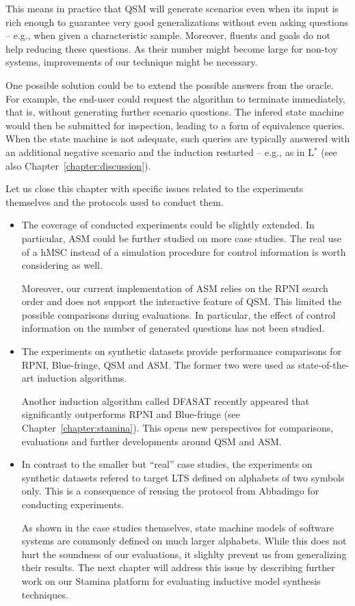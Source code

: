 \begin{itemize}
This means in practice that QSM will generate scenarios even when its input is rich enough to guarantee very good generalizations without even asking questions -- e.g., when given a characteristic sample. Moreover, fluents and goals do not help reducing these questions. As their number might become large for non-toy systems, improvements of our technique might be necessary.

One possible solution could be to extend the possible answers from the oracle. For example, the end-user could request  the algorithm to terminate immediately, that is, without generating further scenario questions. The infered state machine would then be submitted for inspection, leading to a form of equivalence queries. When the state machine is not adequate, such queries are typically answered with an additional negative scenario and the induction restarted -- e.g., as in L$^*$ \cite{Angluin:1987} (see also Chapter~\ref{chapter:discussion}).

\end{itemize}

Let us close this chapter with specific issues related to the experiments themselves and the protocols used to conduct them. 
\begin{itemize}

\item The coverage of conducted experiments could be slightly extended. In particular, ASM could be further studied on more case studies. The real use of a hMSC instead of a simulation procedure for control information is worth considering as well.

Moreover, our current implementation of ASM relies on the RPNI search order and does not support the interactive feature of QSM. This limited the possible comparisons during evaluations. In particular, the effect of control information on the number of generated questions has not been studied.

\item The experiments on synthetic datasets provide performance comparisons for RPNI, Blue-fringe, QSM and ASM. The former two were used as state-of-the-art induction algorithms. 

Another induction algorithm called DFASAT recently appeared that significantly outperforms RPNI and Blue-fringe \cite{Heule:2010} (see Chapter~\ref{chapter:stamina}). This opens new perspectives for comparisons, evaluations and further developments around QSM and ASM. 

\item In contrast to the smaller but ``real'' case studies, the experiments on synthetic datasets refered to target LTS defined on alphabets of two symbols only. This is a consequence of reusing the protocol from Abbadingo for conducting experiments. 

As shown in the case studies themselves, state machine models of software systems are commonly defined on much larger alphabets. While this does not hurt the soundness of our evaluations, it slighlty prevent us from generalizing their results. The next chapter will address this issue by describing further work on our Stamina platform for evaluating inductive model synthesis techniques.
\end{itemize}

